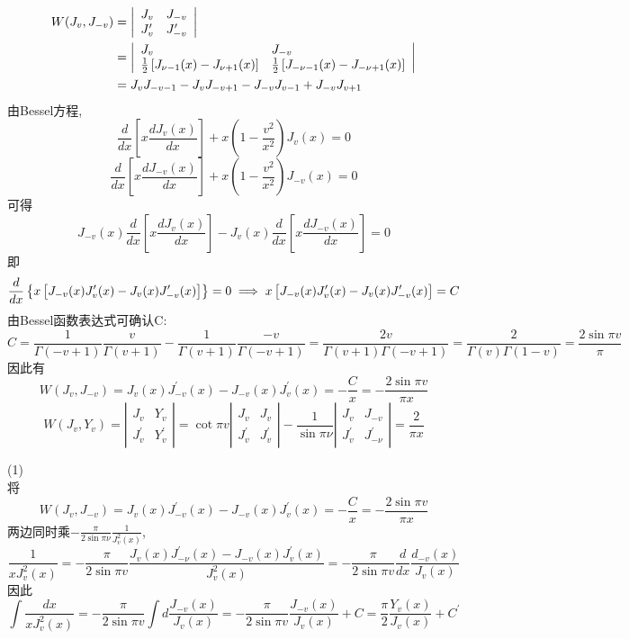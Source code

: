 \documentclass[UTF8,9pt]{ctexart}
\begin{document}
$$\begin{aligned} 
W(J_v,J_{-v}) &= \left| \begin{array}{ll}J_v & J_{-v} \\ J_v' & J_{-v}'\end{array} \right|\\
&= \left| \begin{array}{ll}J_v & J_{-v} \\ \frac{1}{2}\left[J_{\nu-1}(x)-J_{\nu+1}(x)\right] & \frac{1}{2}\left[J_{-\nu-1}(x)-J_{-\nu+1}(x)\right]\end{array} \right|\\
&= J_vJ_{-v-1}-J_vJ_{-v+1}-J_{-v}J_{v-1}+J_{-v}J_{v+1}
 \end{aligned}$$
由Bessel方程,
$$ 
\frac{d}{d x}\left[x \frac{d J_{v}(x)}{d x}\right]+x\left(1-\frac{v^{2}}{x^{2}}\right) J_{v}(x)=0
$$$$ 
\frac{d}{d x}\left[x \frac{d J_{-v}(x)}{d x}\right]+x\left(1-\frac{v^{2}}{x^{2}}\right) J_{-v}(x)=0
$$可得
$$ 
J_{-v}(x) \frac{d}{d x}\left[x \frac{d J_{v}(x)}{d x}\right]-J_{v}(x) \frac{d}{d x}\left[x \frac{d J_{-v}(x)}{d x}\right]=0
$$即$$ 
\frac{d}{d x}\left\{x\left[J_{-v}(x) J_{v}^{\prime}(x)-J_{v}(x) J_{-v}^{\prime}(x)\right]\right\}=0 \implies x\left[J_{-v}(x) J_{v}^{\prime}(x)-J_{v}(x) J_{-v}^{\prime}(x)\right]=C
$$
由Bessel函数表达式可确认C:
$$C=\frac{1}{\Gamma(-v+1)} \frac{v}{\Gamma(v+1)}-\frac{1}{\Gamma(v+1)} \frac{-v}{\Gamma(-v+1)}=\frac{2 v}{\Gamma(v+1) \Gamma(-v+1)}=\frac{2}{\Gamma(v) \Gamma(1-v)}=\frac{2 \sin \pi v}{\pi}$$
因此有
$$ 
W\left(J_{v}, J_{-v}\right)=J_{v}(x) J_{-v}^{\prime}(x)-J_{-v}(x) J_{v}^{\prime}(x)=-\frac{C}{x}=-\frac{2 \sin \pi v}{\pi x}
$$$$ 
W\left(J_{v}, Y_{v}\right)=\left| \begin{array}{ll}{J_{v}} & {Y_{v}} \\ {J_{v}^{\prime}} & {Y_{v}^{\prime}}\end{array}\right|=
\cot \pi v \left| \begin{array}{ll}{J_{v}} & {J_{v}} \\ {J_{v}^{\prime}} & {J_{v}^{\prime}}\end{array}\right|-\frac{1}{\sin \pi \nu} \left| \begin{array}{cc}{J_{v}} & {J_{-v}} \\ {J_{v}^{\prime}} & {J_{-\nu}^{\prime}}\end{array}\right|=\frac{2}{\pi x}$$

(1)\\
将$$ 
W\left(J_{v}, J_{-v}\right)=J_{v}(x) J_{-v}^{\prime}(x)-J_{-v}(x) J_{v}^{\prime}(x)=-\frac{C}{x}=-\frac{2 \sin \pi v}{\pi x}
$$两边同时乘$-\frac{\pi}{2 \sin \pi \nu} \frac{1}{J_{v}^{2}(x)}$,
$$ 
\frac{1}{x J_{v}^{2}(x)}=-\frac{\pi}{2 \sin \pi v} \frac{J_{v}(x) J_{-\nu}^{\prime}(x)-J_{-v}(x) J_{v}^{\prime}(x)}{J_{v}^{2}(x)}=-\frac{\pi}{2 \sin \pi v} \frac{d}{d x} \frac{d_{-v}(x)}{J_{v}(x)}
$$
因此$$ 
\int \frac{d x}{x J_{v}^{2}(x)}=-\frac{\pi}{2 \sin \pi v} \int d \frac{J_{-v}(x)}{J_{v}(x)}=-\frac{\pi}{2 \sin \pi v} \frac{J_{-v}(x)}{J_{v}(x)}+C
=\frac{\pi}{2} \frac{Y_{v}(x)}{J_{v}(x)}+C^{\prime}
$$
\end{document}
